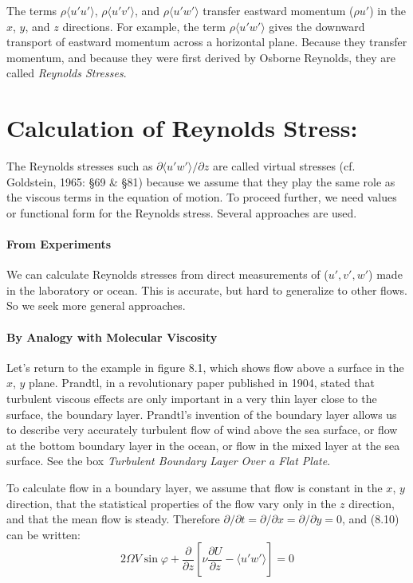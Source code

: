 The terms $\rho{\langle u' u' \rangle}$, $\rho{\langle u' v' \rangle}$, and $\rho{\langle u' w' \rangle}$ transfer
eastward momentum ($\rho u' $) in the $x$, $y$, and $z$ directions. For example, the term $\rho{\langle u' w'
\rangle}$ gives the downward transport of eastward momentum across a
horizontal plane. Because they transfer momentum, and because they were first derived by
Osborne Reynolds, they are called \textit{Reynolds Stresses}.

\section{Calculation of Reynolds Stress:}
The Reynolds stresses such as $\partial{\langle u'w'\rangle}/\partial{z}$ are called virtual stresses (cf. Goldstein, 1965: \S 69 \& \S 81) because we assume that they play the same role as the viscous terms in the equation of motion. To proceed further, we need values or functional form for the Reynolds stress. Several approaches are used.

\paragraph{From Experiments}
We can calculate Reynolds stresses from direct measurements of ($u', v', w'$) made
in the laboratory or ocean. This is accurate, but hard to generalize to other
flows. So we seek more general approaches.

\paragraph{By Analogy with Molecular Viscosity}
Let's return to the example in figure 8.1, which shows flow above a surface in the $x$, $y$ plane. Prandtl, in a revolutionary paper published in 1904, stated that turbulent viscous effects are only important in a very thin layer close to the surface, the boundary layer. Prandtl's invention of the boundary layer allows us to describe very accurately turbulent flow of wind above the sea surface, or flow at the bottom boundary layer in the ocean, or flow in the mixed layer at the sea surface. See the box \textit{Turbulent Boundary Layer Over a Flat Plate}. 

To calculate  flow in a boundary layer, we assume that flow is constant in the $x$, $y$ direction, that the statistical properties of the flow vary only in the $z$ direction, and that the mean flow is steady. Therefore $\partial
/\partial t = \partial /\partial x = \partial /\partial y = 0$, and (8.10) can be written:
\begin{equation}
2 \Omega V \sin \varphi + \frac{\partial }{\partial z} \left[\nu \frac{\partial
U}{\partial z} - \langle u'w'\rangle \right] = 0
\end{equation}

